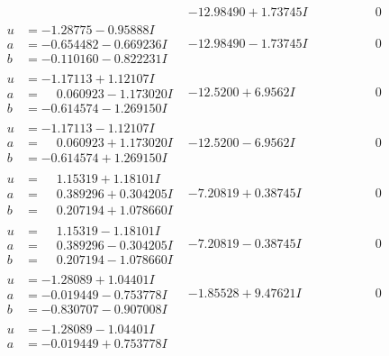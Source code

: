 \documentclass[1p]{elsarticle_modified}
\theoremstyle{definition}
\begin{document}
$$\begin{array}{c|c|c}
 & -12.98490 + 1.73745 I & \phantom{-0.000000 } 0 \\ \hline\begin{aligned}
u &= -1.28775 - 0.95888 I \\
a &= -0.654482 - 0.669236 I \\
b &= -0.110160 - 0.822231 I\end{aligned}
 & -12.98490 - 1.73745 I & \phantom{-0.000000 } 0 \\ \hline\begin{aligned}
u &= -1.17113 + 1.12107 I \\
a &= \phantom{-}0.060923 - 1.173020 I \\
b &= -0.614574 - 1.269150 I\end{aligned}
 & -12.5200 + 6.9562 I & \phantom{-0.000000 } 0 \\ \hline\begin{aligned}
u &= -1.17113 - 1.12107 I \\
a &= \phantom{-}0.060923 + 1.173020 I \\
b &= -0.614574 + 1.269150 I\end{aligned}
 & -12.5200 - 6.9562 I & \phantom{-0.000000 } 0 \\ \hline\begin{aligned}
u &= \phantom{-}1.15319 + 1.18101 I \\
a &= \phantom{-}0.389296 + 0.304205 I \\
b &= \phantom{-}0.207194 + 1.078660 I\end{aligned}
 & -7.20819 + 0.38745 I & \phantom{-0.000000 } 0 \\ \hline\begin{aligned}
u &= \phantom{-}1.15319 - 1.18101 I \\
a &= \phantom{-}0.389296 - 0.304205 I \\
b &= \phantom{-}0.207194 - 1.078660 I\end{aligned}
 & -7.20819 - 0.38745 I & \phantom{-0.000000 } 0 \\ \hline\begin{aligned}
u &= -1.28089 + 1.04401 I \\
a &= -0.019449 - 0.753778 I \\
b &= -0.830707 - 0.907008 I\end{aligned}
 & -1.85528 + 9.47621 I & \phantom{-0.000000 } 0 \\ \hline\begin{aligned}
u &= -1.28089 - 1.04401 I \\
a &= -0.019449 + 0.753778 I \\

\end{aligned}
\end{array}$$
\end{document}
